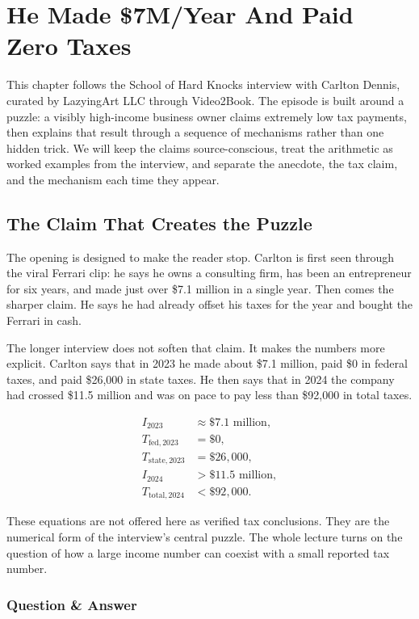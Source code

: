 \chapter{He Made \$7M/Year And Paid Zero Taxes}

This chapter follows the School of Hard Knocks interview with Carlton Dennis, curated by LazyingArt LLC through Video2Book. The episode is built around a puzzle: a visibly high-income business owner claims extremely low tax payments, then explains that result through a sequence of mechanisms rather than one hidden trick. We will keep the claims source-conscious, treat the arithmetic as worked examples from the interview, and separate the anecdote, the tax claim, and the mechanism each time they appear.

\section{The Claim That Creates the Puzzle}

The opening is designed to make the reader stop. Carlton is first seen through the viral Ferrari clip: he says he owns a consulting firm, has been an entrepreneur for six years, and made just over \$7.1 million in a single year. Then comes the sharper claim. He says he had already offset his taxes for the year and bought the Ferrari in cash.

The longer interview does not soften that claim. It makes the numbers more explicit. Carlton says that in 2023 he made about \$7.1 million, paid \$0 in federal taxes, and paid \$26,000 in state taxes. He then says that in 2024 the company had crossed \$11.5 million and was on pace to pay less than \$92,000 in total taxes.

\begin{align}
I_{2023} &\approx \$7.1\text{ million},\\
T_{\mathrm{fed},2023} &= \$0,\\
T_{\mathrm{state},2023} &= \$26{,}000,\\
I_{2024} &> \$11.5\text{ million},\\
T_{\mathrm{total},2024} &< \$92{,}000.
\end{align}

These equations are not offered here as verified tax conclusions. They are the numerical form of the interview's central puzzle. The whole lecture turns on the question of how a large income number can coexist with a small reported tax number.

\subsection{Question \& Answer}


